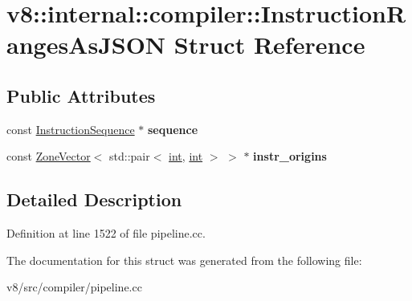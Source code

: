 \hypertarget{structv8_1_1internal_1_1compiler_1_1InstructionRangesAsJSON}{}\section{v8\+:\+:internal\+:\+:compiler\+:\+:Instruction\+Ranges\+As\+J\+S\+ON Struct Reference}
\label{structv8_1_1internal_1_1compiler_1_1InstructionRangesAsJSON}
\subsection*{Public Attributes}
\begin{DoxyCompactItemize}
\item 
\mbox{\label{structv8_1_1internal_1_1compiler_1_1InstructionRangesAsJSON_adbae5d898e0fcba9d9b3220111261bef}} 
const \mbox{\hyperlink{classv8_1_1internal_1_1compiler_1_1InstructionSequence}{Instruction\+Sequence}} $\ast$ {\bfseries sequence}
\item 
\mbox{\label{structv8_1_1internal_1_1compiler_1_1InstructionRangesAsJSON_aaca31a6c8bf17bdf43d8d75f7819056c}} 
const \mbox{\hyperlink{classv8_1_1internal_1_1ZoneVector}{Zone\+Vector}}$<$ std\+::pair$<$ \mbox{\hyperlink{classint}{int}}, \mbox{\hyperlink{classint}{int}} $>$ $>$ $\ast$ {\bfseries instr\+\_\+origins}
\end{DoxyCompactItemize}


\subsection{Detailed Description}


Definition at line 1522 of file pipeline.\+cc.



The documentation for this struct was generated from the following file\+:\begin{DoxyCompactItemize}
\item 
v8/src/compiler/pipeline.\+cc\end{DoxyCompactItemize}
